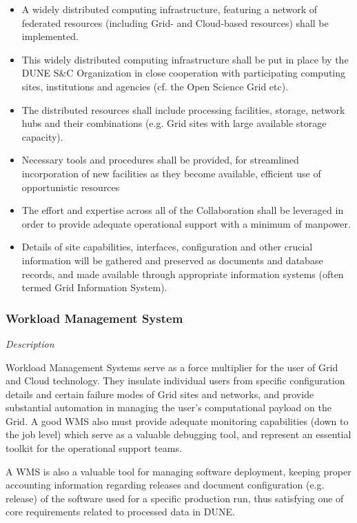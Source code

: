 \begin{itemize}
	\item A widely distributed computing infrastructure, featuring a network of federated resources (including Grid- and Cloud-based resources) shall be implemented.
	
	\item This widely distributed computing infrastructure shall be put in place by the DUNE S\&C Organization in close cooperation with participating computing sites, institutions and agencies (cf. the Open Science Grid etc).

	
	\item The distributed resources shall include processing facilities, storage, network hubs and their combinations (e.g. Grid sites with large available storage capacity).
	
	\item Necessary tools and procedures shall be provided, for streamlined incorporation of new facilities as they become available, efficient use of opportunistic resources 
	
	\item The effort and expertise across all of the Collaboration shall be leveraged in order to provide adequate operational support with a minimum of manpower.
	
	\item Details of site capabilities, interfaces, configuration and other crucial information will be gathered and preserved as documents and database records, and made available through appropriate information systems (often termed Grid Information System).
\end{itemize}

\subsubsection{Workload Management System}
\label{sec:req-wms}
\textit{Description}

Workload Management Systems serve as a force multiplier for the user of Grid and Cloud technology. They insulate individual users from specific configuration details and certain failure modes of Grid sites and networks, and provide substantial automation in managing the user's computational payload on the Grid. A good WMS also must provide adequate monitoring capabilities (down to the job level) which serve as a valuable debugging tool, and represent an essential toolkit for the operational support teams.

A WMS is also a valuable tool for managing software deployment, keeping proper accounting information regarding releases and document configuration (e.g. release) of the software used for a specific production run, thus satisfying one of core requirements related to processed data in DUNE.

